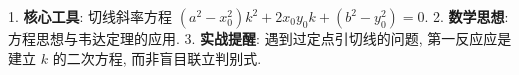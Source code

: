 \begin{summarybox}
1. \textbf{核心工具}: 切线斜率方程 $(a^2 - x_0^2)k^2 + 2x_0y_0k + (b^2 - y_0^2) = 0$.
2. \textbf{数学思想}: 方程思想与韦达定理的应用.
3. \textbf{实战提醒}: 遇到过定点引切线的问题, 第一反应应是建立 $k$ 的二次方程, 而非盲目联立判别式.
\end{summarybox}